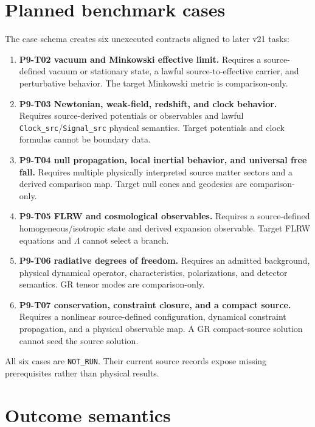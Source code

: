 \documentclass[11pt]{article}
\begin{document}
\section{Planned benchmark cases}

The case schema creates six unexecuted contracts aligned to later v21 tasks:

\begin{enumerate}
\item \textbf{P9-T02 vacuum and Minkowski effective limit.}
      Requires a source-defined vacuum or stationary state, a lawful
      source-to-effective carrier, and perturbative behavior.  The target
      Minkowski metric is comparison-only.
\item \textbf{P9-T03 Newtonian, weak-field, redshift, and clock behavior.}
      Requires source-derived potentials or observables and lawful
      \texttt{Clock\_src}/\texttt{Signal\_src} physical semantics.  Target
      potentials and clock formulas cannot be boundary data.
\item \textbf{P9-T04 null propagation, local inertial behavior, and universal
      free fall.} Requires multiple physically interpreted source matter
      sectors and a derived comparison map.  Target null cones and geodesics
      are comparison-only.
\item \textbf{P9-T05 FLRW and cosmological observables.}
      Requires a source-defined homogeneous/isotropic state and derived
      expansion observable.  Target FLRW equations and \(\Lambda\) cannot
      select a branch.
\item \textbf{P9-T06 radiative degrees of freedom.}
      Requires an admitted background, physical dynamical operator,
      characteristics, polarizations, and detector semantics.  GR tensor
      modes are comparison-only.
\item \textbf{P9-T07 conservation, constraint closure, and a compact source.}
      Requires a nonlinear source-defined configuration, dynamical constraint
      propagation, and a physical observable map.  A GR compact-source
      solution cannot seed the source solution.
\end{enumerate}

All six cases are \texttt{NOT\_RUN}.  Their current source records expose
missing prerequisites rather than physical results.

\section{Outcome semantics}
\end{document}
